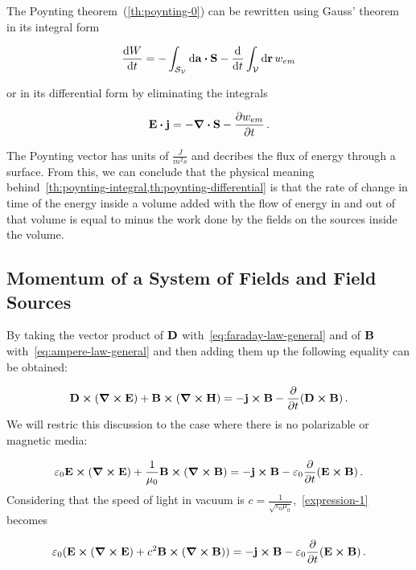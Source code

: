 \documentclass[12pt, class=report, crop=false]{standalone}
\begin{document}
\par
The Poynting theorem~(\ref{th:poynting-0}) can be rewritten using Gauss' theorem in its integral form

\begin{equation}
  \label{th:poynting-integral}
  \dv{W}{t} = - \int_{\mathcal{S}_\mathcal{V}} \dd{\vb{a}} \vdot \vb{S} - \dv{t} \int_\mathcal{V} \dd{\vb{r}} w_{em}
\end{equation}

or in its differential form by eliminating the integrals

\begin{equation}
  \label{th:poynting-differential}
  \vb{E}\vdot\vb{j} = - \div{\vb{S}} - \pdv{w_{em}}{t} \,.
\end{equation}

The Poynting vector has units of \(\frac{J}{m^2 s}\) and decribes the flux of energy through a surface. From this, we can conclude that the physical meaning behind~\cref{th:poynting-integral,th:poynting-differential} is that the rate of change in time of the energy inside a volume  added with the flow of energy in and out of that volume is equal to minus the work done by the fields on the sources inside the volume.

\subsection{Momentum of a System of Fields and Field Sources}
\label{section:momentum}
By taking the vector product of \(\vb{D}\) with~\cref{eq:faraday-law-general} and of \(\vb{B}\) with~\cref{eq:ampere-law-general} and then adding them up the following equality can be obtained:

\begin{equation}
  \vb{D}\cp (\curl{\vb{E}}) + \vb{B}\cp (\curl{\vb{H}}) = - \vb{j}\cp \vb{B} - \pdv{t} (\vb{D}\cp\vb{B}) \,.
\end{equation}
We will restric this discussion to the case where there is no polarizable or magnetic media:

\begin{equation}
  \label{expression-1}
  \varepsilon_0 \vb{E}\cp (\curl{\vb{E}}) + \frac{1}{\mu_0}\vb{B}\cp (\curl{\vb{B}}) = - \vb{j}\cp \vb{B} - \varepsilon_0 \pdv{t} (\vb{E}\cp\vb{B}) \,.
\end{equation}
Considering that the speed of light in vacuum is \(c=\frac{1}{\sqrt{\varepsilon_0 \mu_0}}\),~\cref{expression-1} becomes

\begin{equation}
  \label{expression-1}
  \varepsilon_0 (\vb{E}\cp (\curl{\vb{E}}) + c^{2} \vb{B}\cp (\curl{\vb{B}})) = - \vb{j}\cp \vb{B} - \varepsilon_0 \pdv{t} (\vb{E}\cp\vb{B}) \,.
\end{equation}
\end{document}
